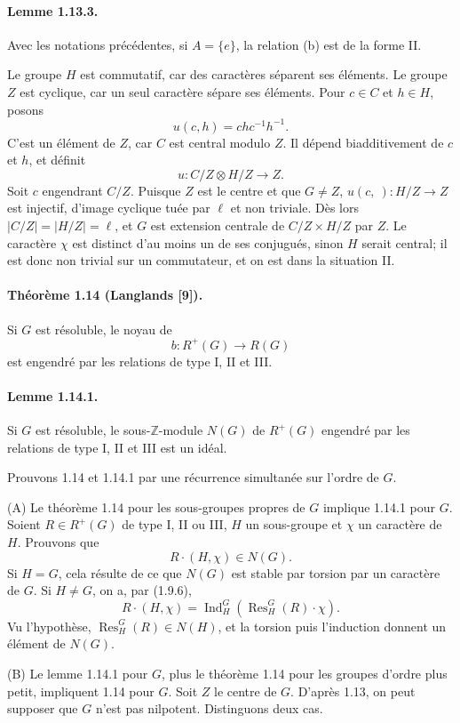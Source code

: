 \documentclass[10pt]{article}
\newcommand{\Z}{\mathbb Z}
\newcommand{\Ind}{\operatorname{Ind}}
\newcommand{\Res}{\operatorname{Res}}
\begin{document}
\paragraph{Lemme 1.13.3.} Avec les notations précédentes, si \(A=\{e\}\), la relation (b) est de la forme II.

Le groupe \(H\) est commutatif, car des caractères séparent ses éléments. Le groupe \(Z\) est cyclique, car un seul caractère sépare ses éléments. Pour \(c\in C\) et \(h\in H\), posons
\[
u(c,h)=chc^{-1}h^{-1}.
\]
C'est un élément de \(Z\), car \(C\) est central modulo \(Z\). Il dépend biadditivement de \(c\) et \(h\), et définit
\[
u:C/Z\otimes H/Z\longrightarrow Z.
\]
Soit \(c\) engendrant \(C/Z\). Puisque \(Z\) est le centre et que \(G\ne Z\), \(u(c,\ ) :H/Z\to Z\) est injectif, d'image cyclique tuée par \(\ell\) et non triviale. Dès lors \(|C/Z|=|H/Z|=\ell\), et \(G\) est extension centrale de \(C/Z\times H/Z\) par \(Z\). Le caractère \(\chi\) est distinct d'au moins un de ses conjugués, sinon \(H\) serait central; il est donc non trivial sur un commutateur, et on est dans la situation II.

\paragraph{Théorème 1.14 (Langlands [9]).} Si \(G\) est résoluble, le noyau de
\[
b:R^+(G)\longrightarrow R(G)
\]
est engendré par les relations de type I, II et III.

\paragraph{Lemme 1.14.1.} Si \(G\) est résoluble, le sous-\(\Z\)-module \(N(G)\) de \(R^+(G)\) engendré par les relations de type I, II et III est un idéal.

Prouvons 1.14 et 1.14.1 par une récurrence simultanée sur l'ordre de \(G\).

(A) Le théorème 1.14 pour les sous-groupes propres de \(G\) implique 1.14.1 pour \(G\). Soient \(R\in R^+(G)\) de type I, II ou III, \(H\) un sous-groupe et \(\chi\) un caractère de \(H\). Prouvons que
\[
R\cdot(H,\chi)\in N(G).
\]
Si \(H=G\), cela résulte de ce que \(N(G)\) est stable par torsion par un caractère de \(G\). Si \(H\ne G\), on a, par (1.9.6),
\[
R\cdot(H,\chi)=\Ind_H^G(\Res_H^G(R)\cdot\chi).
\]
Vu l'hypothèse, \(\Res_H^G(R)\in N(H)\), et la torsion puis l'induction donnent un élément de \(N(G)\).

(B) Le lemme 1.14.1 pour \(G\), plus le théorème 1.14 pour les groupes d'ordre plus petit, impliquent 1.14 pour \(G\). Soit \(Z\) le centre de \(G\). D'après 1.13, on peut supposer que \(G\) n'est pas nilpotent. Distinguons deux cas.
\end{document}
